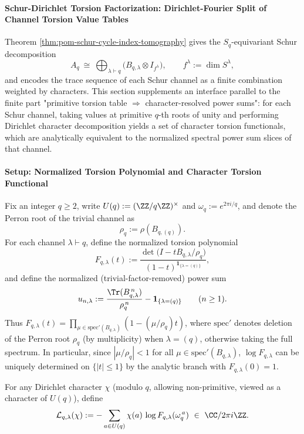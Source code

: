 
\paragraph{Schur-Dirichlet Torsion Factorization: Dirichlet-Fourier Split of Channel Torsion Value Tables}
Theorem \ref{thm:pom-schur-cycle-index-tomography} gives the \(S_q\)-equivariant Schur decomposition
\[
A_q\ \cong\ \bigoplus_{\lambda\vdash q}\bigl(B_{q,\lambda}\otimes I_{f^\lambda}\bigr),
\qquad f^\lambda:=\dim S^\lambda,
\]
and encodes the trace sequence of each Schur channel as a finite combination weighted by characters.
This section supplements an interface parallel to the finite part "primitive torsion table \(\Rightarrow\) character-resolved power sums": for each Schur channel, taking values at primitive \(q\)-th roots of unity and performing Dirichlet character decomposition yields a set of character torsion functionals, which are analytically equivalent to the normalized spectral power sum slices of that channel.

\paragraph{Setup: Normalized Torsion Polynomial and Character Torsion Functional}
Fix an integer \(q\ge2\), write \(U(q):=(\ZZ/q\ZZ)^\times\) and \(\omega_q:=e^{2\pi i/q}\), and denote the Perron root of the trivial channel as
\[
\rho_q:=\rho(B_{q,(q)}).
\]
For each channel \(\lambda\vdash q\), define the normalized torsion polynomial
\[
F_{q,\lambda}(t)
:=
\frac{\det\!\bigl(I-tB_{q,\lambda}/\rho_q\bigr)}
{(1-t)^{\mathbf 1_{\{\lambda=(q)\}}}},
\]
and define the normalized (trivial-factor-removed) power sum
\[
u_{n,\lambda}
:=
\frac{\Tr(B_{q,\lambda}^{\,n})}{\rho_q^{\,n}}
-\mathbf 1_{\{\lambda=(q)\}}
\qquad(n\ge1).
\]
Thus \(F_{q,\lambda}(t)=\prod_{\mu\in\mathrm{spec}'(B_{q,\lambda})}(1-(\mu/\rho_q)t)\), where \(\mathrm{spec}'\) denotes deletion of the Perron root \(\rho_q\) (by multiplicity) when \(\lambda=(q)\), otherwise taking the full spectrum.
In particular, since \(|\mu/\rho_q|<1\) for all \(\mu\in\mathrm{spec}'(B_{q,\lambda})\), \(\log F_{q,\lambda}\) can be uniquely determined on \(\{|t|\le1\}\) by the analytic branch with \(F_{q,\lambda}(0)=1\).

\begin{definition}\label{def:pom-schur-dirichlet-torsion-functional}
For any Dirichlet character \(\chi\) (modulo \(q\), allowing non-primitive, viewed as a character of \(U(q)\)), define
\[
\mathcal{L}_{q,\lambda}(\chi)
:=
-\sum_{a\in U(q)}\chi(a)\,\log F_{q,\lambda}(\omega_q^{\,a})
\ \in\ \CC/2\pi i\ZZ.
\]
\end{definition}

